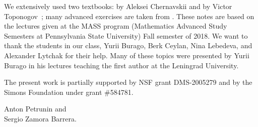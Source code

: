 We extensively used two textbooks: by Aleksei Chernavskii \cite{chernavsky} and by Victor Toponogov~\cite{toponogov-book};
many advanced exercises are taken from \cite{petrunin2020}.
These notes are based on the lectures given at the MASS program (Mathematics Advanced Study Semesters at Pennsylvania State University) Fall semester of 2018.
We want to thank the students in our class, 
Yurii Burago, 
Berk Ceylan,
Nina Lebedeva,
and
Alexander Lytchak
for their help.
Many of these topics were presented by Yurii Burago in his lectures teaching the first author at the Leningrad University.

The present work is partially supported by NSF grant DMS-2005279
and by the Simons Foundation under grant \#584781.

\begin{flushright}
Anton Petrunin and\\
Sergio Zamora Barrera.
\end{flushright}




